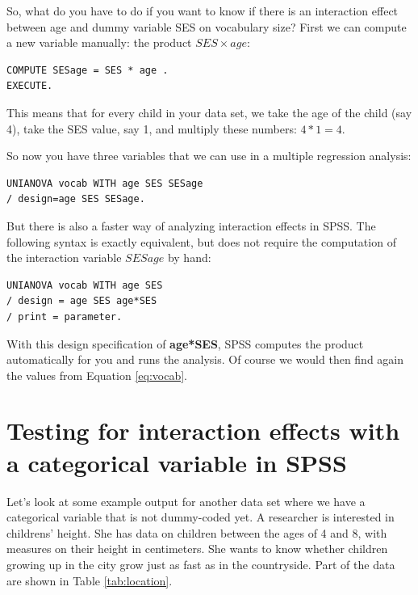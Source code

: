 \documentclass[]{book}\usepackage[]{graphicx}\usepackage[]{color}
\begin{document}
So, what do you have to do if you want to know if there is an interaction effect between age and dummy variable SES on vocabulary size?  First we can compute a new variable manually: the product $SES \times age$:


\begin{verbatim}
COMPUTE SESage = SES * age .
EXECUTE.
\end{verbatim}

This means that for every child in your data set, we take the age of the child (say 4), take the SES value, say 1, and multiply these numbers: $4*1=4$.


So now you have three variables that we can use in a multiple regression analysis:

\begin{verbatim}
UNIANOVA vocab WITH age SES SESage
/ design=age SES SESage.
\end{verbatim}


But there is also a faster way of analyzing interaction effects in SPSS. The following syntax is exactly equivalent, but does not require the computation of the interaction variable $SESage$ by hand:

\begin{verbatim}
UNIANOVA vocab WITH age SES 
/ design = age SES age*SES
/ print = parameter.
\end{verbatim}

With this design specification of \textbf{age*SES}, SPSS computes the product automatically for you and runs the analysis. Of course we would then find again the values from Equation \ref{eq:vocab}.



\section{Testing for interaction effects with a categorical variable in SPSS}


Let's look at some example output for another data set where we have a categorical variable that is not dummy-coded yet. A researcher is interested in childrens' height. She has data on children between the ages of 4 and 8, with measures on their height in centimeters. She wants to know whether children growing up in the city grow just as fast as in the countryside. Part of the data are shown in Table \ref{tab:location}.
 
 
 
\end{document}
